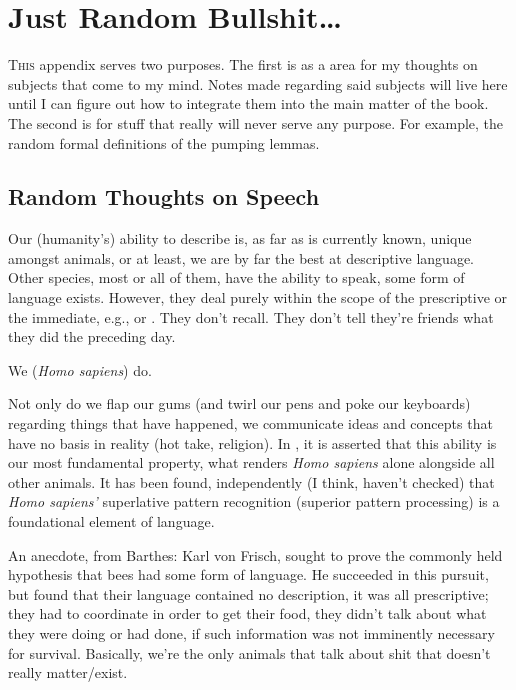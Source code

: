 \documentclass[../butidigress.tex]{subfiles}
\begin{document}
\chapter{Just Random Bullshit\dots}\label{chap:justrandom}
\newpage

\lettrine{T}{his} appendix serves two purposes.
The first is as a area for my thoughts on subjects that come to my mind.
Notes made regarding said subjects will live here until I can figure out how to integrate them into the main matter of the book.
The second is for stuff that really will never serve any purpose.
For example, the random formal definitions of the pumping lemmas.

\section{Random Thoughts on Speech}
Our (humanity's) ability to describe is, as far as is currently known, unique amongst animals, or at least, we are by far the best at descriptive language.
Other species, most or all of them, have the ability to speak, some form of language exists.
However, they deal purely within the scope of the prescriptive or the immediate, e.g.,  or .
They don't recall.
They don't tell they're friends what they did the preceding day.

We (\textit{Homo sapiens}) do.

Not only do we flap our gums (and twirl our pens and poke our keyboards) regarding things that have happened, we communicate ideas and concepts that have no basis in reality (hot take, religion). In , it is asserted that this ability is our most fundamental property, what renders \emph{Homo sapiens} alone alongside all other animals\autocite{sapiens}.
It has been found, independently (I think, haven't checked) that \emph{Homo sapiens'} superlative pattern recognition (superior pattern processing) is a foundational element of language.

An anecdote, from Barthes: Karl von Frisch, sought to prove the commonly held hypothesis that bees had some form of language.
He succeeded in this pursuit, but found that their language contained no description, it was all prescriptive; they had to coordinate in order to get their food, they didn't talk about what they were doing or had done, if such information was not imminently necessary for survival.
Basically, we're the only animals that talk about shit that doesn't really matter/exist.
\end{document}

